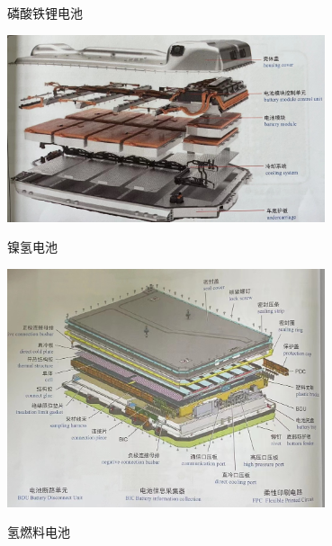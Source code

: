 \begin{frame}
	\begin{block}{}
		\begin{compactitem}
			\item 磷酸铁锂电池
			\begin{center}
				\includegraphics[width=0.7\textwidth]{2-48}
			\end{center}
		\end{compactitem}
	\end{block}
\end{frame}
\begin{frame}
	\begin{block}{}
		\begin{compactitem}
			\item 镍氢电池
			\begin{center}
				\includegraphics[width=0.7\textwidth]{2-49}
			\end{center}
			\item 氢燃料电池
		\end{compactitem}
	\end{block}
\end{frame}
